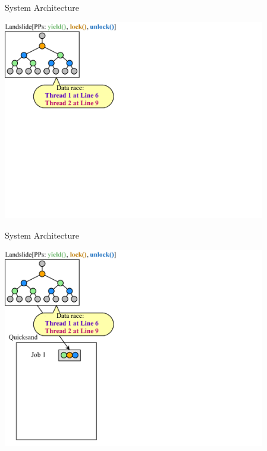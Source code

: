 \documentclass[xcolor=dvipsnames]{beamer}
\begin{document}
\begin{frame}{System Architecture}
	\begin{center}
	\vspace{-0.88em}
	\includegraphics[width=0.86\textwidth]{dr-jobs-1.pdf}
	\end{center}
\end{frame}
\begin{frame}{System Architecture}
	\begin{center}
	\vspace{-0.88em}
	\includegraphics[width=0.86\textwidth]{dr-jobs-2.pdf}
	\end{center}
\end{frame}
\end{document}

